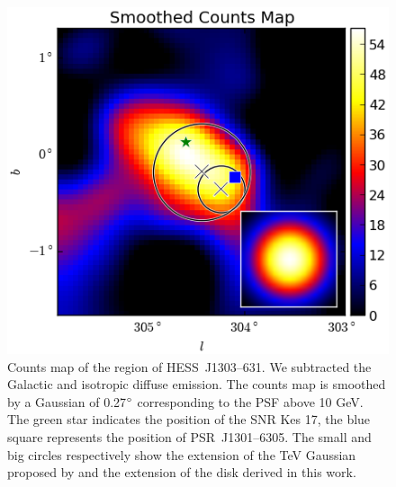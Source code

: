 \begin{figure}[h!]
\centering
\includegraphics[]{figures/HESSJ1303m631.eps}
\caption{Counts map of the region of HESS~J1303--631. We subtracted the Galactic and isotropic diffuse emission. The counts map is smoothed by a Gaussian of 0.27$\mbox{$^\circ$}$ corresponding to the PSF above 10 GeV. The green star indicates the position of the SNR Kes 17, the blue square represents the position of PSR~J1301--6305. The small and big circles respectively show the extension of the TeV Gaussian proposed by \cite{2005AA...439.1013A} and the extension of the disk derived in this work.
\label{1303}}
\end{figure}

